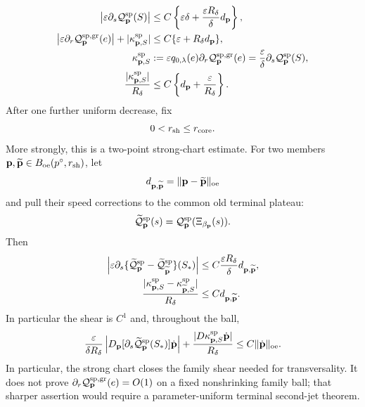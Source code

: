 \begin{lemma}
\begin{align}
 \left|\varepsilon\partial_s
       \mathcal Q_{\mathbf p}^{\rm sp}(S)\right|
 &\le C\left\{\varepsilon\delta
       +\frac{\varepsilon R_\delta}{\delta}d_{\mathbf p}\right\},
                                                        \label{eq:oe-family-terminal-speed-time-jet}\\
 \left|\varepsilon\partial_r
       \mathcal Q_{\mathbf p}^{\rm sp,gr}(e)\right|
 +|\kappa_{\mathbf p,S}^{\rm sp}|
 &\le C\{\varepsilon+R_\delta d_{\mathbf p}\},\notag\\
 \kappa_{\mathbf p,S}^{\rm sp}
 &:=\varepsilon q_{0,\lambda}(e)
       \partial_r\mathcal Q_{\mathbf p}^{\rm sp,gr}(e)
 =\frac{\varepsilon}{\delta}
       \partial_s\mathcal Q_{\mathbf p}^{\rm sp}(S),\notag\\
 \frac{|\kappa_{\mathbf p,S}^{\rm sp}|}{R_\delta}
 &\le C\left\{d_{\mathbf p}+\frac\varepsilon{R_\delta}\right\}.
                                                        \label{eq:oe-family-terminal-speed-shear-bound}
\end{align}
After one further uniform decrease, fix
\begin{equation}
 0<r_{\rm sh}\le r_{\rm core}.                 \label{eq:oe-family-terminal-shear-C1-radius}
\end{equation}
More strongly, this is a two-point strong-chart estimate.  For two
members
\(\mathbf p,\widetilde{\mathbf p}
\in B_{\rm oe}(p^\circ,r_{\rm sh})\), let
\[
 d_{\mathbf p,\widetilde{\mathbf p}}
 =\|\mathbf p-\widetilde{\mathbf p}\|_{\rm oe}
\]
and pull their speed corrections to the common old terminal plateau:
\[
 \widetilde{\mathcal Q}_{\mathbf p}^{\rm sp}(s)
 =\mathcal Q_{\mathbf p}^{\rm sp}
       (\Xi_{\beta_{\mathbf p}}(s)).
\]
Then
\begin{align}
 \left|\varepsilon\partial_s
   \{\widetilde{\mathcal Q}_{\mathbf p}^{\rm sp}
        -\widetilde{\mathcal Q}_{\widetilde{\mathbf p}}^{\rm sp}\}
          (S_*)\right|
 &\le C\frac{\varepsilon R_\delta}{\delta}
       d_{\mathbf p,\widetilde{\mathbf p}},\notag\\
 \frac{|\kappa_{\mathbf p,S}^{\rm sp}
       -\kappa_{\widetilde{\mathbf p},S}^{\rm sp}|}
       {R_\delta}
 &\le C d_{\mathbf p,\widetilde{\mathbf p}}.   \label{eq:oe-family-terminal-speed-shear-two-point}
\end{align}
In particular the shear is \(C^1\) and, throughout the ball,
\begin{equation}
 \frac{\varepsilon}{\delta R_\delta}
 \left|D_{\mathbf p}
   [\partial_s\widetilde{\mathcal Q}_{\mathbf p}^{\rm sp}(S_*)]
       \dot{\mathbf p}\right|
 +\frac{|D\kappa_{\mathbf p,S}^{\rm sp}
       \dot{\mathbf p}|}{R_\delta}
 \le C\|\dot{\mathbf p}\|_{\rm oe}.            \label{eq:oe-family-terminal-speed-shear-C1}
\end{equation}
In particular, the strong chart closes the family shear needed for
transversality.  It does not prove
\(\partial_r\mathcal Q_{\mathbf p}^{\rm sp,gr}(e)=O(1)\) on a fixed
nonshrinking family ball; that sharper assertion would require a
parameter-uniform terminal second-jet theorem.
\end{lemma}


